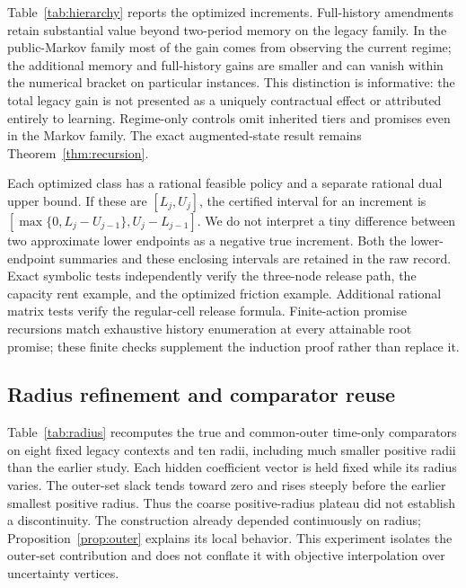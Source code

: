 \documentclass[11pt,letterpaper]{article}
\theoremstyle{definition}\newtheorem{assumption}[theorem]{Assumption}
\begin{document}
Table~\ref{tab:hierarchy} reports the optimized increments. Full-history amendments retain substantial value beyond two-period memory on the legacy family. In the public-Markov family most of the gain comes from observing the current regime; the additional memory and full-history gains are smaller and can vanish within the numerical bracket on particular instances. This distinction is informative: the total legacy gain is not presented as a uniquely contractual effect or attributed entirely to learning. Regime-only controls omit inherited tiers and promises even in the Markov family. The exact augmented-state result remains Theorem~\ref{thm:recursion}.



Each optimized class has a rational feasible policy and a separate rational dual upper bound. If these are $[L_j,U_j]$, the certified interval for an increment is
$[\max\{0,L_j-U_{j-1}\},U_j-L_{j-1}]$. We do not interpret a tiny difference between two approximate lower endpoints as a negative true increment. Both the lower-endpoint summaries and these enclosing intervals are retained in the raw record. Exact symbolic tests independently verify the three-node release path, the capacity rent example, and the optimized friction example. Additional rational matrix tests verify the regular-cell release formula. Finite-action promise recursions match exhaustive history enumeration at every attainable root promise; these finite checks supplement the induction proof rather than replace it.

\subsection{Radius refinement and comparator reuse}
Table~\ref{tab:radius} recomputes the true and common-outer time-only comparators on eight fixed legacy contexts and ten radii, including much smaller positive radii than the earlier study. Each hidden coefficient vector is held fixed while its radius varies. The outer-set slack tends toward zero and rises steeply before the earlier smallest positive radius. Thus the coarse positive-radius plateau did not establish a discontinuity. The construction already depended continuously on radius; Proposition~\ref{prop:outer} explains its local behavior. This experiment isolates the outer-set contribution and does not conflate it with objective interpolation over uncertainty vertices.

\end{document}
